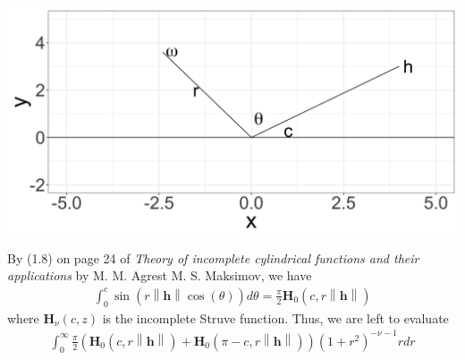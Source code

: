 \documentclass[11pt]{article}
\begin{document}
\includegraphics[scale = .1]{angle_plot.png}


%
% 

 By (1.8) on page 24 of \textit{Theory of incomplete cylindrical functions and their applications} by M. M. Agrest  M. S. Maksimov, we have \begin{align*}
 \int_0^{c}  \sin(r\left\lVert \boldsymbol{h}\right\rVert \cos(\theta)) d\theta= \frac{\pi}{2} \boldsymbol{H}_{0}(c, r\left\lVert \boldsymbol{h}\right\rVert)
 \end{align*}where $\boldsymbol{H}_{\nu}(c, z)$ is the incomplete Struve function. Thus, we are left to evaluate \begin{align*} 
 \int_0^\infty \frac{\pi}{2}\left(\boldsymbol{H}_{0}(c, r\left\lVert \boldsymbol{h}\right\rVert) + \boldsymbol{H}_{0}(\pi - c, r\left\lVert \boldsymbol{h}\right\rVert)\right) (1+r^2)^{-\nu-1} r dr
 \end{align*}
 
 
 
\end{document}
